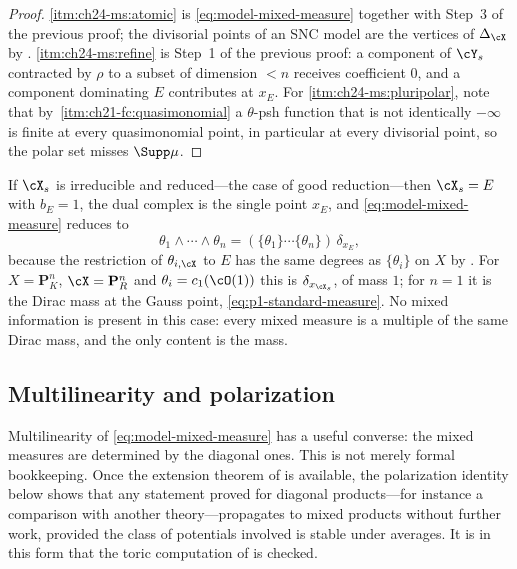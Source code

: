 \begin{proof}
\cref{itm:ch24-ms:atomic} is \eqref{eq:model-mixed-measure} together with
Step~3 of the previous proof; the divisorial points of an SNC model are the
vertices of \(\Delta_{\cX}\) by .
\cref{itm:ch24-ms:refine} is Step~1 of the previous proof: a component of
\(\cY_s\) contracted by \(\rho\) to a subset of dimension \(<n\) receives
coefficient \(0\), and a component dominating \(E\) contributes at
\(x_E\).  For \cref{itm:ch24-ms:pluripolar}, note that by
\,\cref{itm:ch21-fc:quasimonomial} a
\(\theta\)-psh function that is not identically \(-\infty\) is finite at every
quasimonomial point, in particular at every divisorial point, so the polar
set misses \(\Supp\mu\).
\end{proof}

\begin{example}
\label{ex:ch24-good-reduction}
If \(\cX_s\) is irreducible and reduced---the case of good reduction---then
\(\cX_s=E\) with \(b_E=1\), the dual complex is the single point \(x_E\),
and \eqref{eq:model-mixed-measure} reduces to
\[
 \theta_1\wedge\cdots\wedge\theta_n=(\{\theta_1\}\cdots\{\theta_n\})\,
 \delta_{x_E},
\]
because the restriction of \(\theta_{i,\cX}\) to \(E\) has the same degrees
as \(\{\theta_i\}\) on \(X\) by
.  For \(X=\mathbf P^n_K\),
\(\cX=\mathbf P^n_R\) and \(\theta_i=c_1(\cO(1))\) this is
\(\delta_{x_{\cX_s}}\), of mass \(1\); for \(n=1\) it is the Dirac mass at
the Gauss point, \eqref{eq:p1-standard-measure}.  No mixed information is
present in this case: every mixed measure is a multiple of the same Dirac
mass, and the only content is the mass.
\end{example}

\subsection{Multilinearity and polarization}
\label{sec:ch24-polarization}

Multilinearity of \eqref{eq:model-mixed-measure} has a useful converse: the
mixed measures are determined by the diagonal ones.  This is not merely
formal bookkeeping.  Once the extension theorem of
 is available, the polarization identity below shows
that any statement proved for diagonal products---for instance a comparison
with another theory---propagates to mixed products without further work,
provided the class of potentials involved is stable under averages.  It is
in this form that the toric computation of
 is checked.

